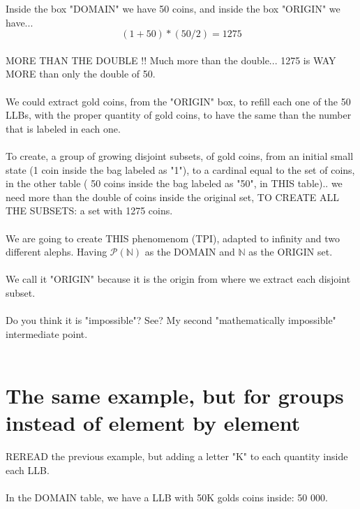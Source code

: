 		\noindent
		Inside the box "DOMAIN" we have 50 coins, and inside the box "ORIGIN" we have...\\
		$$ (1+50)*(50/2) =1275 $$\\
		MORE THAN THE DOUBLE !! Much more than the double... 1275 is WAY MORE than only the double of 50.
		\\\\
		
		\noindent
		We could extract gold coins, from the "ORIGIN" box, to refill each one of the 50 LLBs, with the proper quantity of gold coins, to have the same than the number that is labeled in each one.
		\\\\
		
		\noindent
		To create, a group of growing disjoint subsets, of gold coins, from an initial small state (1 coin inside the bag labeled as "1"), to a cardinal equal to the set of coins, in the other table ( 50 coins inside the bag labeled as "50", in THIS table).. we need more than the double of coins inside the original set, TO CREATE ALL THE SUBSETS: a set with 1275 coins.
		\\\\
		
		\noindent
		We are going to create THIS phenomenom (TPI), adapted to infinity and two different alephs. Having $\mathcal{P(\mathbb{N})}$ as the DOMAIN and $\mathbb{N}$ as the ORIGIN set.
		\\\\
		
		\noindent
		We call it "ORIGIN" because it is the origin from where we extract each disjoint subset.
		\\\\
		
		\noindent
		Do you think it is "impossible"? See? My second "mathematically impossible" intermediate point.
		\\\\
	
	\section {The same example, but for groups instead of element by element}
	
		\noindent
		REREAD the previous example, but adding a letter "K" to each quantity inside each LLB.
		\\\\
		
		\noindent
		In the DOMAIN table, we have a LLB with 50K golds coins inside: 50 000.
		\\\\
		
